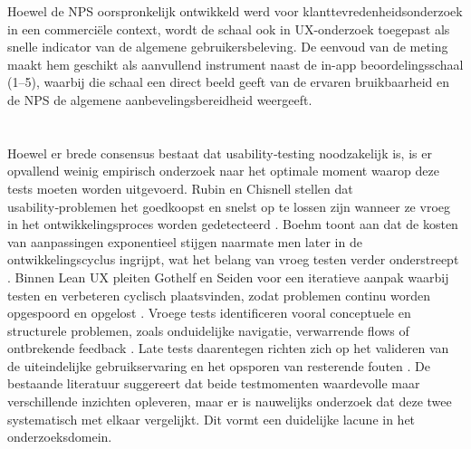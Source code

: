 Hoewel de NPS oorspronkelijk ontwikkeld werd voor klanttevredenheidsonderzoek in een commerciële context, wordt de schaal ook in UX-onderzoek toegepast als snelle indicator van de algemene gebruikersbeleving. De eenvoud van de meting maakt hem geschikt als aanvullend instrument naast de in-app beoordelingsschaal (1–5), waarbij die schaal een direct beeld geeft van de ervaren bruikbaarheid en de NPS de algemene aanbevelingsbereidheid weergeeft.

\section{}
Hoewel er brede consensus bestaat dat usability‑testing noodzakelijk is, is er opvallend weinig empirisch onderzoek naar het optimale moment waarop deze tests moeten worden uitgevoerd. Rubin en Chisnell stellen dat usability‑problemen het goedkoopst en snelst op te lossen zijn wanneer ze vroeg in het ontwikkelingsproces worden gedetecteerd \autocite{RubinChisnell2008}. Boehm toont aan dat de kosten van aanpassingen exponentieel stijgen naarmate men later in de ontwikkelingscyclus ingrijpt, wat het belang van vroeg testen verder onderstreept \autocite{Boehm1981}. Binnen Lean UX pleiten Gothelf en Seiden voor een iteratieve aanpak waarbij testen en verbeteren cyclisch plaatsvinden, zodat problemen continu worden opgespoord en opgelost \autocite{GothelfSeiden2016}. Vroege tests identificeren vooral conceptuele en structurele problemen, zoals onduidelijke navigatie, verwarrende flows of ontbrekende feedback \autocite{RubinChisnell2008}. Late tests daarentegen richten zich op het valideren van de uiteindelijke gebruikservaring en het opsporen van resterende fouten \autocite{GothelfSeiden2016}. De bestaande literatuur suggereert dat beide testmomenten waardevolle maar verschillende inzichten opleveren, maar er is nauwelijks onderzoek dat deze twee systematisch met elkaar vergelijkt. Dit vormt een duidelijke lacune in het onderzoeksdomein.

